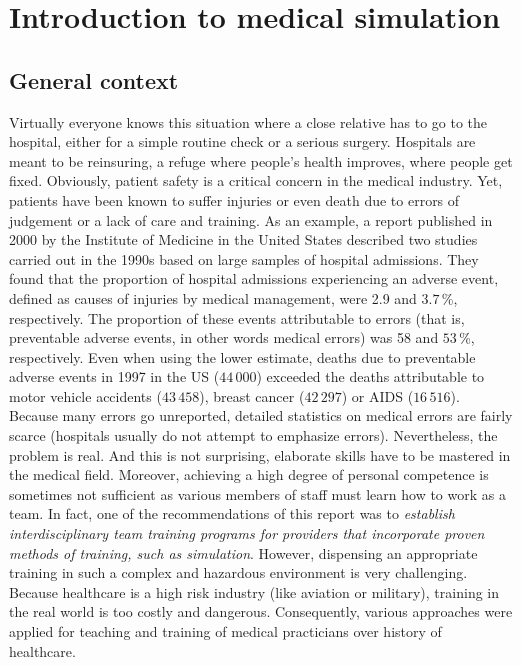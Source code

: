 \chapter{Introduction to medical simulation}
\label{chap1}


\section{General context}

Virtually everyone knows this situation where a close relative has to go to the hospital, either for a simple routine check or a serious surgery. Hospitals are meant to be reinsuring, a refuge where people's health improves, where people get fixed. Obviously, patient safety is a critical concern in the medical industry. Yet, patients have been known to suffer injuries or even death due to errors of judgement or a lack of care and training. As an example, a report published in 2000 by the Institute of Medicine in the United States \citep{Kohn00} described two studies carried out in the 1990s based on large samples of hospital admissions. They found that the proportion of hospital admissions experiencing an adverse event, defined as causes of injuries by medical management, were 2.9 and $3.7\,$\%, respectively. The proportion of these events attributable to errors (that is, preventable adverse events, in other words medical errors) was 58 and $53\,$\%, respectively. Even when using the lower estimate, deaths due to preventable adverse events in 1997 in the US ($44\,000$) exceeded the deaths attributable to motor vehicle accidents ($43\,458$), breast cancer ($42\,297$) or AIDS ($16\,516$). Because many errors go unreported, detailed statistics on medical errors are fairly scarce (hospitals usually do not attempt to emphasize errors). Nevertheless, the problem is real. And this is not surprising, elaborate skills have to be mastered in the medical field. Moreover, achieving a high degree of personal competence is sometimes not sufficient as various members of staff must learn how to work as a team. In fact, one of the recommendations of this report \citep{Kohn00} was to \emph{establish interdisciplinary team training programs for providers that incorporate proven methods of training, such as simulation}. However, dispensing an appropriate training in such a complex and hazardous environment is very challenging. Because healthcare is a high risk industry (like aviation or military), training in the real world is too costly and dangerous. Consequently, various approaches were applied for teaching and training of medical practicians over history of healthcare. 

